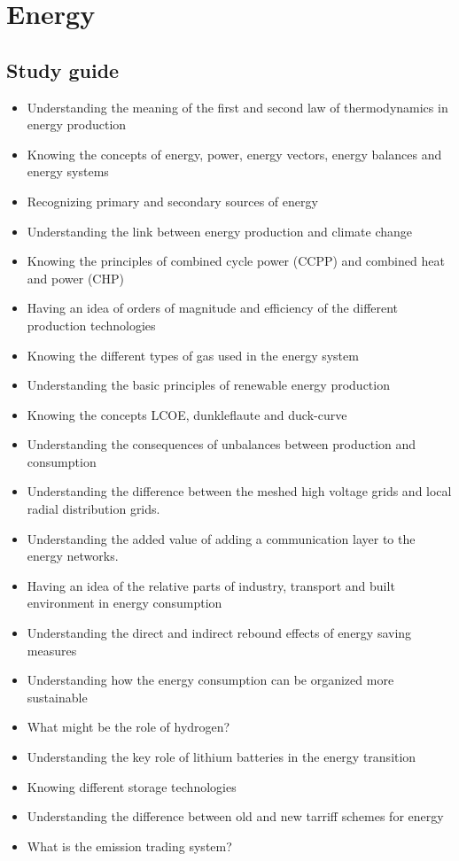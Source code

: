 \documentclass[../summary.tex]{subfiles}
\begin{document}
	
	\section{Energy}
	
	\subsection{Study guide}
	\begin{itemize} 
		\item Understanding the meaning of the first and second law of thermodynamics in energy production
		\item Knowing the concepts of energy, power, energy vectors, energy balances and energy systems
		\item Recognizing primary and secondary sources of energy
		\item Understanding the link between energy production and climate change
		\item Knowing the principles of combined cycle power (CCPP) and combined heat and power (CHP)
		\item Having an idea of orders of magnitude and efficiency of the different production technologies
		\item Knowing the different types of gas used in the energy system
		\item Understanding the basic principles of renewable energy production
		\item Knowing the concepts LCOE, dunkleflaute and duck-curve
		\item Understanding the consequences of unbalances between production and consumption
		\item Understanding the difference between the meshed high voltage grids and local radial distribution grids.
		\item Understanding the added value of adding a communication layer to the energy networks.
		\item Having an idea of the relative parts of industry, transport and built environment in energy
		consumption
		\item Understanding the direct and indirect rebound effects of energy saving measures
		\item Understanding how the energy consumption can be organized more sustainable
		\item What might be the role of hydrogen?
		\item Understanding the key role of lithium batteries in the energy transition
		\item Knowing different storage technologies
		\item Understanding the difference between old and new tarriff schemes for energy
		\item What is the emission trading system?
	\end{itemize}
	
\end{document}

